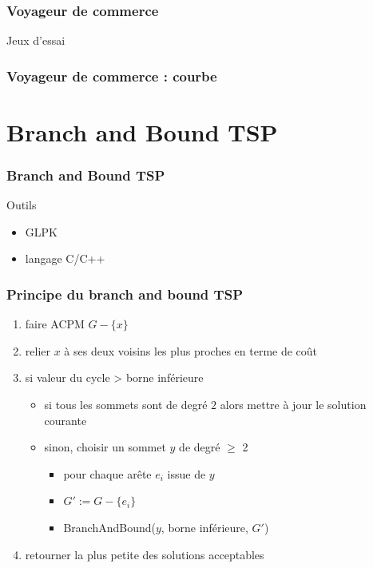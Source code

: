 \documentclass[french]{beamer}
\begin{document}
\begin{frame}
\frametitle{Voyageur de commerce}
\begin{block}{Jeux d'essai}
\end{block}
\end{frame}

\begin{frame}
\frametitle{Voyageur de commerce : courbe}
\end{frame}

\section{Branch and Bound TSP}

\begin{frame}
  \frametitle{Branch and Bound TSP}
  \begin{block}{Outils}
    \begin{itemize}
    \item GLPK
    \item langage C/C++
    \end{itemize}
  \end{block}
\end{frame}

\begin{frame}
\frametitle{Principe du branch and bound TSP}
\begin{enumerate}
 \item faire ACPM $G - \{x \}$
  \item relier $x$ à ses deux voisins les plus proches en terme de coût
  \item si {valeur du cycle > borne inférieure}
   \begin{itemize}
\item si {tous les sommets sont de degré $2$} alors mettre à jour le solution courante
\item sinon, choisir un sommet $y$ de degré $\geq$ 2
\begin{itemize}
\item  pour {chaque arête $e_i$ issue de $y$}
\item  $G' := G - \{ e_i \}$
\item BranchAndBound($y$, borne inférieure, $G'$)
\end{itemize}
\end{itemize}
    \item retourner la plus petite des solutions acceptables
\end{enumerate}

\end{frame}
\end{document}
